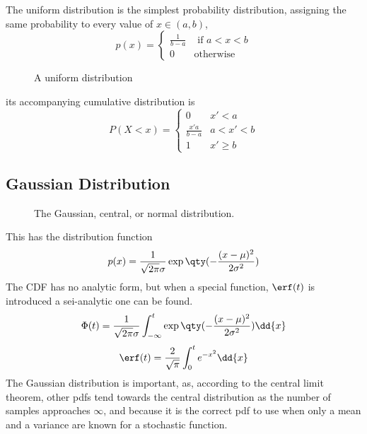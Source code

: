 \documentclass{dwnotes}         		        %
\begin{document}
The uniform distribution is the simplest probability distribution,
assigning the same probability to every value of $x \in (a,b)$,
\begin{equation}
  \label{eq:uniformdistro}
  p(x) =  
\begin{cases}
    \frac{1}{b-a} & \text{ if $a < x < b$} \\
    0 & \text{otherwise}
  \end{cases}
\end{equation}
\begin{figure}
  \centering
  
  \caption{A uniform distribution}
  \label{fig:uniform}
\end{figure}
its accompanying cumulative distribution is
\begin{equation}
  \label{eq:uniformcdf}
P(X<x) = 
\begin{cases}
  0 & x' < a \\
\frac{x'a}{b-a} & a < x' < b \\
1 &  x' \geq b
\end{cases}
\end{equation}

\subsection{Gaussian Distribution}
\label{sec:gaussian}

\begin{figure}
  \centering
  
\label{fig:gaussian}
  \caption{The Gaussian, central, or normal distribution.}
\end{figure}

This has the distribution function 
\begin{equation}
  \label{eq:gaussian}
  p(x) = \frac{1}{\sqrt{2 \pi} \sigma} \exp \qty(- \frac{(x-\mu)^2}{2 \sigma^2})
\end{equation}
The CDF has no analytic form, but when a special function, $\erf(t)$
is introduced a sei-analytic one can be found.
\begin{equation}
  \label{eq:cdfgaussian}
  \Phi(t) = \frac{1}{\sqrt{2 \pi} \sigma} \int_{-\infty}^t \exp \qty(- \frac{(x-\mu)^2}{2 \sigma^2}) \dd{x}
\end{equation}
\begin{equation}
  \label{eq:erf}
  \erf(t) = \frac{2}{\sqrt{\pi}} \int_0^t e^{-x^2} \dd{x}
\end{equation}
The Gaussian distribution is important, as, according to the central
limit theorem, other pdfs tend towards the central distribution as the
number of samples approaches $\infty$, and because it is the correct
pdf to use when only a mean and a variance are known for a stochastic
function.
\end{document}
